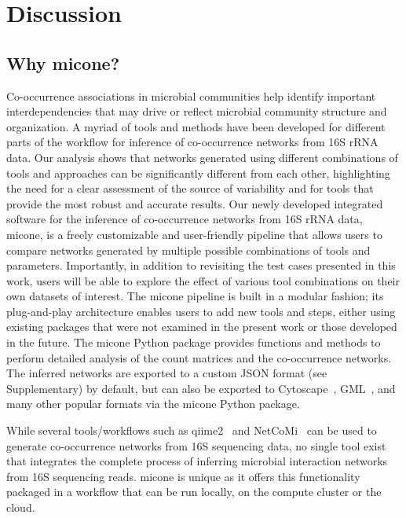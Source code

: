 
\section*{Discussion}

  \subsection*{Why \ac{micone}?}

  Co-occurrence associations in microbial communities help identify important interdependencies that may drive or reflect microbial community structure and organization.
  A myriad of tools and methods have been developed for different parts of the workflow for inference of co-occurrence networks from 16S rRNA data.
  Our analysis shows that networks generated using different combinations of tools and approaches can be significantly different from each other, highlighting the need for a clear assessment of the source of variability and for tools that provide the most robust and accurate results.
  Our newly developed integrated software for the inference of co-occurrence networks from 16S rRNA data, \ac{micone}, is a freely customizable and user-friendly pipeline that allows users to compare networks generated by multiple possible combinations of tools and parameters.
  Importantly, in addition to revisiting the test cases presented in this work, users will be able to explore the effect of various tool combinations on their own datasets of interest.
  The \ac{micone} pipeline is built in a modular fashion; its plug-and-play architecture enables users to add new tools and steps, either using existing packages that were not examined in the present work or those developed in the future.
  The \ac{micone} Python package provides functions and methods to perform detailed analysis of the count matrices and the co-occurrence networks.
  The inferred networks are exported to a custom JSON format (see Supplementary) by default, but can also be exported to Cytoscape~\cite{shannonCytoscapeSoftwareEnvironment2003}, GML~\cite{himsoltGMLPortableGraph2010}, and many other popular formats via the \ac{micone} Python package.

  While several tools/workflows such as \ac{qiime2}~\cite{bolyenReproducibleInteractiveScalable2019} and NetCoMi~\cite{peschelNetCoMiNetworkConstruction2020} can be used to generate co-occurrence networks from 16S sequencing data, no single tool exist that integrates the complete process of inferring microbial interaction networks from 16S sequencing reads.
  \ac{micone} is unique as it offers this functionality packaged in a workflow that can be run locally, on the compute cluster or the cloud.

